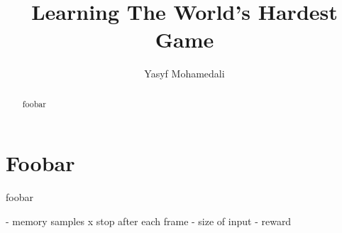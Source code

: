 \documentclass[preprint,12pt]{elsarticle}
\begin{document}
\begin{frontmatter}
\title{Learning The World's Hardest Game}

\author{Yasyf Mohamedali}

\address{6.867 Project Proposal}

\begin{abstract}
foobar
\end{abstract}
\end{frontmatter}

\section{Foobar}
foobar

- memory samples
x stop after each frame
- size of input
- reward
\end{document}
